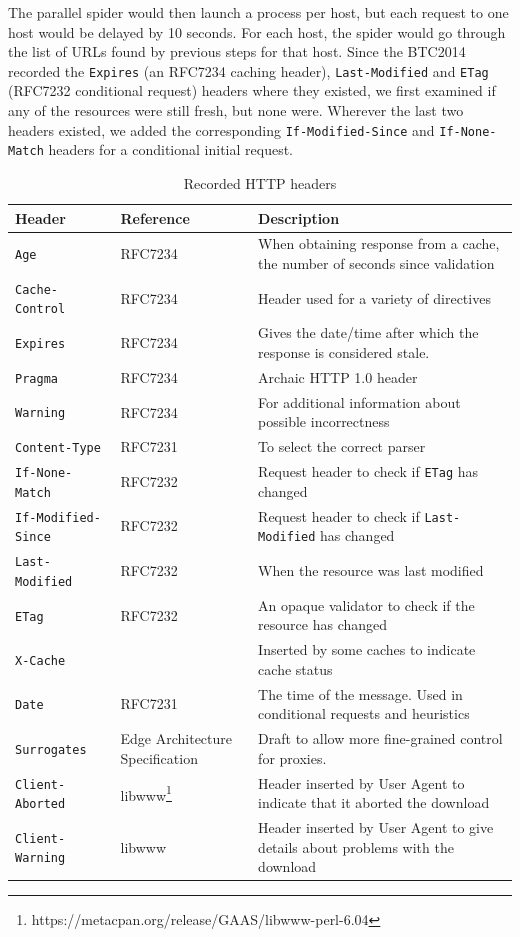 \documentclass{llncs}
\newcommand{\httph}[1]{\texttt{#1}}
\begin{document}
\begin{subappendices}
The parallel spider would then launch a process per host, but each
request to one host would be delayed by 10 seconds. For each host, the
spider would go through the list of URLs found by previous steps for
that host. Since the BTC2014 recorded
the \httph{Expires} (an RFC7234 caching header), \httph{Last-Modified}
and \httph{ETag} (RFC7232 conditional request) headers where they
existed, we first examined if any of the resources were still fresh,
but none were. Wherever the last two headers existed, we added the
corresponding \httph{If-Modified-Since} and \httph{If-None-Match}
headers for a conditional initial request.

\begin{table}
\caption{Recorded HTTP headers}\label{tab:headers}
 \begin{tabular}{ | l |  p{3cm} | p{5cm} |}
    \hline
    Header & Reference & Description \\ \hline
\httph{Age} & RFC7234 & When obtaining response from a cache, the number of
seconds since validation \\ \hline
\httph{Cache-Control} & RFC7234 & Header used for a variety of directives \\ \hline
\httph{Expires} & RFC7234  & Gives the date/time after which the
   response is considered stale. \\ \hline
\httph{Pragma} & RFC7234 & Archaic HTTP 1.0 header  \\ \hline
\httph{Warning} & RFC7234  & For additional information about possible incorrectness \\ \hline
\httph{Content-Type} & RFC7231 & To select the correct parser \\ \hline
\httph{If-None-Match} & RFC7232  & Request header to check if
                                   \httph{ETag} has changed   \\ \hline
\httph{If-Modified-Since} & RFC7232  & Request header to check if
                                   \httph{Last-Modified} has changed    \\ \hline
\httph{Last-Modified} & RFC7232 & When the resource was last modified \\ \hline
\httph{ETag} & RFC7232 & An opaque validator to check if the resource
has changed  \\ \hline
\httph{X-Cache} &  & Inserted by some caches to indicate cache status \\ \hline
\httph{Date} & RFC7231 & The time of the message. Used in conditional requests
and heuristics \\ \hline
\httph{Surrogates} & Edge Architecture Specification\cite{edgearch} & Draft
to allow more fine-grained control for proxies. \\ \hline
\httph{Client-Aborted} & libwww\footnote{https://metacpan.org/release/GAAS/libwww-perl-6.04}  & Header inserted by User
Agent to indicate that it aborted the download \\ \hline
\httph{Client-Warning} & libwww  & Header inserted by User
Agent to give details about problems with the download \\ \hline


\end{tabular}
\end{table}
\end{subappendices}
\end{document}
